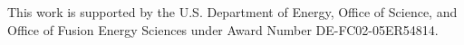 \documentclass[aip, pop, preprint]{revtex4-1}
\begin{document}
This work is supported by the U.S. Department of Energy, Office of Science, and
Office of Fusion Energy Sciences under Award Number DE-FC02-05ER54814.



%
%

%



%


\end{document}
